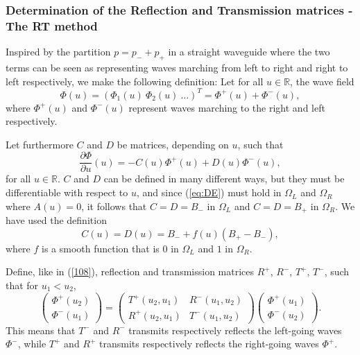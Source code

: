 \documentclass[numreferences]{kluwer}
\renewcommand{\Phi}{\varPhi}
\renewcommand{\vec}[1]{\bm{#1}}
\newcommand{\R}{\mathbb R}
\renewcommand{\Phi}{\varPhi}
\begin{document}
\subsubsection{Determination of the Reflection and Transmission
  matrices - The RT method}
\label{sec:RT}

Inspired by the partition $p=p_-+p_+$ in a straight waveguide
where the two terms can be seen as representing waves marching from
left to right and right to left respectively, we make the following
definition: Let for all $u\in\R$, the wave field
\begin{equation}
  \label{eq:Phipart1}
  \vec\Phi(u)=(\Phi_1(u)\ \Phi_2(u)\ \dots)^T
  =\vec\Phi^+(u)+\vec\Phi^-(u),
\end{equation}
where $\vec\Phi^+(u)$ and $\vec\Phi^-(u)$ represent waves marching to
the right and left respectively.

Let furthermore $C$ and $D$ be matrices, depending on $u$, such that
\begin{equation}
  \label{eq:plusminustodiff}
    \dfrac{\partial\vec\Phi}{\partial u}(u)=
    -C(u)\vec\Phi^+(u)+D(u)\vec\Phi^-(u),
\end{equation}
for all $u\in\R$. $C$ and $D$ can be defined in many different ways,
but they must be differentiable with respect to $u$, and since
(\ref{eq:DE}) must hold in $\Omega_L$ and $\Omega_R$ where $A(u)=0$,
it follows that $C=D=B_-$ in $\Omega_L$ and $C=D=B_+$ in
$\Omega_R$. We have used the definition
\begin{equation}
  \label{eq:CD}
  C(u)=D(u)=B_-+f(u)(B_+-B_-),
\end{equation}
where $f$ is a smooth function that is $0$ in $\Omega_L$ and $1$ in
$\Omega_R$.

Define, like in (\ref{108}), reflection and transmission
matrices $R^+$, $R^-$, $T^+$, $T^-$, such that for $u_1<u_2$,
\begin{equation}
  \label{eq:RT}
  \begin{pmatrix}
    \vec\Phi^+(u_2)\\
    \vec\Phi^-(u_1)
  \end{pmatrix}=
  \begin{pmatrix}
    T^+(u_2,u_1)&R^-(u_1,u_2)\\
    R^+(u_2,u_1)&T^-(u_1,u_2)
  \end{pmatrix}
  \begin{pmatrix}
    \vec\Phi^+(u_1)\\
    \vec\Phi^-(u_2)
  \end{pmatrix}.
\end{equation}
This means that $T^-$ and $R^-$ transmits respectively reflects the
left-going waves $\vec\Phi^-$, while $T^+$ and $R^+$ transmits
respectively reflects the right-going waves $\vec\Phi^+$.
\end{document}
